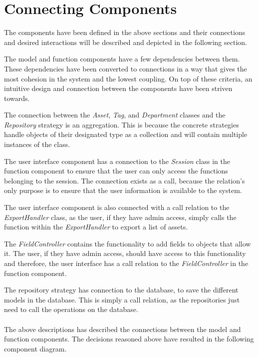\section{Connecting Components} \label{sc:connecting_components}
The components have been defined in the above sections and their connections and desired interactions will be described and depicted in the following section.
\par
The model and function components have a few dependencies between them. These dependencies have been converted to connections in a way that gives the most cohesion in the system and the lowest coupling. On top of these criteria, an intuitive design and connection between the components have been striven towards.
\par
The connection between the \textit{Asset}, \textit{Tag}, and \textit{Department} classes and the \textit{Repository} strategy is an aggregation. This is because the concrete strategies handle objects of their designated type as a collection and will contain multiple instances of the class.
\par
The user interface component has a connection to the \textit{Session} class in the function component to ensure that the user can only access the functions belonging to the session. The connection exists as a call, because the relation's only purpose is to ensure that the user information is available to the system.
\par
The user interface component is also connected with a call relation to the \textit{ExportHandler} class, as the user, if they have admin access, simply calls the function within the \textit{ExportHandler} to export a list of assets.
\par
The \textit{FieldController} contains the functionality to add fields to objects that allow it. The user, if they have admin access, should have access to this functionality and therefore, the user interface has a call relation to the \textit{FieldController} in the function component.
\par
The repository strategy has connection to the database, to save the different models in the database. This is simply a call relation, as the repositories just need to call the operations on the database.\\\\
The above descriptions has described the connections between the model and function components. The decisions reasoned above have resulted in the following component diagram.

